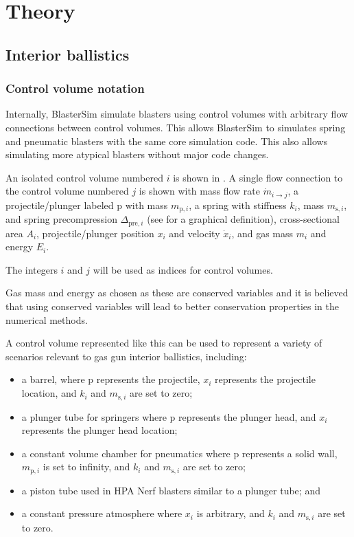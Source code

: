 \chapter{Theory}\label{theory}

\section{Interior ballistics}\label{interior-ballistics}


\subsection{Control volume notation}\label{notation}



Internally, BlasterSim simulate blasters using control volumes with arbitrary flow connections between control volumes.
This allows BlasterSim to simulates spring and pneumatic blasters with the same core simulation code.
This also allows simulating more atypical blasters without major code changes.

An isolated control volume numbered $i$ is shown in .
A single flow connection to the control volume numbered $j$ is shown with
mass flow rate $\dot{m}_{i \rightarrow j}$,
a projectile/plunger labeled p with mass $m_{\text{p},i}$,
a spring with stiffness $k_i$, mass $m_{\text{s},i}$, and spring precompression $\Delta_{\text{pre},i}$ (see  for a graphical definition),
cross-sectional area $A_i$,
projectile/plunger position $x_i$ and velocity $\dot{x}_i$, and
gas mass $m_i$ and energy $E_i$.

The integers $i$ and $j$ will be used as indices for control volumes.

Gas mass and energy as chosen as these are conserved variables and it is believed that using conserved variables will lead to better conservation properties in the numerical methods.

A control volume represented like this can be used to represent a variety of scenarios relevant to gas gun interior ballistics, including:
\begin{itemize}
\item a barrel, where p represents the projectile, $x_i$ represents the projectile location, and $k_i$ and $m_{\text{s},i}$ are set to zero;
\item a plunger tube for springers where p represents the plunger head, and $x_i$ represents the plunger head location;
\item a constant volume chamber for pneumatics where p represents a solid wall, $m_{\text{p},i}$ is set to infinity, and $k_i$ and $m_{\text{s},i}$ are set to zero;
\item a piston tube used in HPA Nerf blasters similar to a plunger tube; and %
\item a constant pressure atmosphere where $x_i$ is arbitrary, and $k_i$ and $m_{\text{s},i}$ are set to zero.
\end{itemize}

